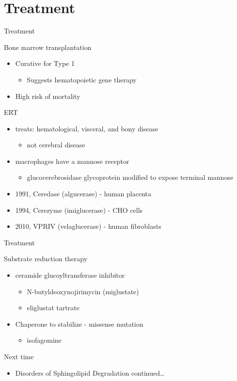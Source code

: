\documentclass[presentation, smaller]{beamer}
\begin{document}
\section{Treatment}
\label{sec:orgheadline21}

\begin{frame}[label={sec:orgheadline18}]{Treatment}
\begin{block}{Bone marrow transplantation}
\begin{itemize}
\item Curative for Type 1
\begin{itemize}
\item Suggests hematopoietic gene therapy
\end{itemize}
\item High risk of mortality
\end{itemize}
\end{block}
\begin{block}{ERT}
\begin{itemize}
\item treats: hematological, visceral, and bony disease
\begin{itemize}
\item not cerebral disease
\end{itemize}
\item macrophages have a mannose receptor
\begin{itemize}
\item glucocerebrosidase glycoprotein modified to expose terminal mannose
\end{itemize}
\item 1991, Ceredase (algucerase) - human placenta
\item 1994, Cerezyme (imiglucerase) - CHO cells
\item 2010, VPRIV (velaglucerase) - human fibroblasts
\end{itemize}
\end{block}
\end{frame}

\begin{frame}[label={sec:orgheadline19}]{Treatment}
\begin{block}{Substrate reduction therapy}
\begin{itemize}
\item ceramide glucoyltransferase inhibitor
\begin{itemize}
\item N-butyldeoxynojirimycin (miglustate)
\item eliglustat tartrate
\end{itemize}
\item Chaperone to stabilize - missense mutation
\begin{itemize}
\item isofagomine
\end{itemize}
\end{itemize}
\end{block}
\end{frame}


\begin{frame}[label={sec:orgheadline20}]{Next time}
\begin{itemize}
\item Disorders of Sphingolipid Degradation continued\ldots{}
\end{itemize}
\end{frame}
\end{document}
